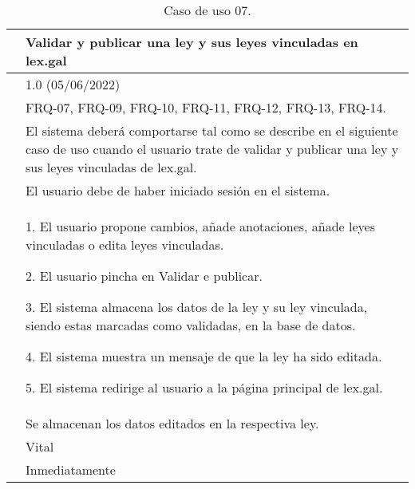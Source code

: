 \begin{table}[H]
\begin{center}
\begin{tabular}{|p{3cm}|p{10cm}|} \hline
\centering {\bf UC-07} & Validar y publicar una ley y sus leyes vinculadas en lex.gal  \\ \hline\hline
\centering {\bf Versión} & 1.0 (05/06/2022) \\ \hline
\centering {\bf Dependencias} & FRQ-07, FRQ-09, FRQ-10, FRQ-11, FRQ-12, FRQ-13, FRQ-14. \\ \hline
\centering {\bf Descripción} &  El sistema deberá comportarse tal como se describe en el siguiente caso de uso cuando el usuario trate de validar y publicar una ley y sus leyes vinculadas de lex.gal. \\ \hline
\centering {\bf Precondición} &  El usuario debe de haber iniciado sesión en el sistema. \\ \hline
\centering {\bf Secuencia normal} &  
1. El usuario propone cambios, añade anotaciones, añade leyes vinculadas o edita leyes vinculadas.

2. El usuario pincha en Validar e publicar.

3. El sistema almacena los datos de la ley y su ley vinculada, siendo estas marcadas como validadas, en la base de datos.

4. El sistema muestra un mensaje de que la ley ha sido editada.

5. El sistema redirige al usuario a la página principal de lex.gal.
\\ \hline
\centering {\bf Postcondición} &  Se almacenan los datos editados en la respectiva ley. \\ \hline
\centering {\bf Importancia} & Vital \\ \hline
\centering {\bf Urgencia} & Inmediatamente \\ \hline
\end{tabular}
\caption{Caso de uso 07.}
\label{enlaceUC7}
\end{center}
\end{table}


